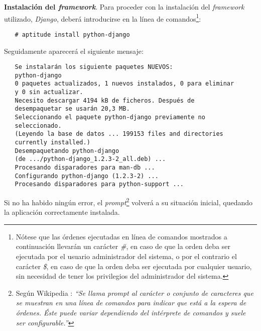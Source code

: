 \item \textbf{Instalación del \textit{framework}}.
   Para proceder con la instalación del \textit{framework} utilizado,
   \textit{Django}, deberá introducirse en la línea de
   comandos\footnote{Nótese que las órdenes ejecutadas en línea de comandos
   mostrados a continuación llevarán un carácter \textit{\#}, en caso de que la
   orden deba ser ejecutada por el usuario administrador del sistema, o por el
   contrario el carácter \textit{\$}, en caso de que la orden deba ser ejecutada
   por cualquier usuario, sin necesidad de tener los privilegios del
   administrador del sistema.}:

   \begin{verbatim}
   # aptitude install python-django
   \end{verbatim}

   Seguidamente aparecerá el siguiente mensaje:

   \begin{verbatim}
   Se instalarán los siguiente paquetes NUEVOS:
   python-django
   0 paquetes actualizados, 1 nuevos instalados, 0 para eliminar
   y 0 sin actualizar.
   Necesito descargar 4194 kB de ficheros. Después de
   desempaquetar se usarán 20,3 MB.
   Seleccionando el paquete python-django previamente no
   seleccionado.
   (Leyendo la base de datos ... 199153 files and directories
   currently installed.)
   Desempaquetando python-django
   (de .../python-django_1.2.3-2_all.deb) ...
   Procesando disparadores para man-db ...
   Configurando python-django (1.2.3-2) ...
   Procesando disparadores para python-support ...
   \end{verbatim}

   Si no ha habido ningún error, el \textit{prompt}\footnote{Según Wikipedia
   \cite{wikipedia2}: \textit{``Se llama prompt al carácter o conjunto de
   caracteres que se muestran en una línea de comandos para indicar que está a
   la espera de órdenes. Éste puede variar dependiendo del intérprete de
   comandos y suele ser configurable.''}} volverá a su situación inicial,
   quedando la aplicación correctamente instalada.
